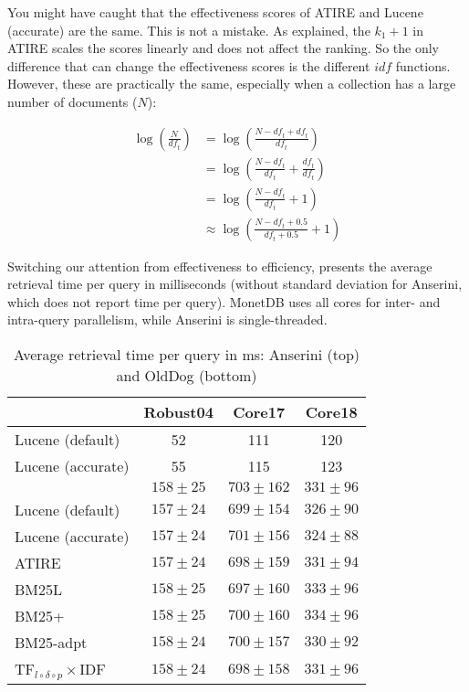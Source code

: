 You might have caught that the effectiveness scores of ATIRE and Lucene (accurate) are the same. This is not a mistake. As explained, the $k_1+1$ in ATIRE scales the scores linearly and does not affect the ranking. So the only difference that can change the effectiveness scores is the different $\mathit{idf}$ functions. However, these are practically the same, especially when a collection has a large number of documents ($N$):

\begin{align}
	\log\left(\frac{N}{\mathit{df}_t}\right) &= \log\left(\frac{N-\mathit{df}_t+\mathit{df}_t}{\mathit{df}_t}\right) \\
	&= \log\left(\frac{N-\mathit{df}_t}{\mathit{df}_t} + \frac{\mathit{df}_t}{\mathit{df}_t}\right) \\
	&= \log\left(\frac{N-\mathit{df}_t}{\mathit{df}_t} + 1\right) \\
	&\approx \log\left(\frac{N-\mathit{df}_t+0.5}{\mathit{df}_t+0.5} + 1\right)
\end{align}

Switching our attention from effectiveness to efficiency,
 presents the average retrieval time per query in milliseconds (without standard deviation for Anserini, which does not report time per query). MonetDB uses all cores for inter- and intra-query parallelism, while Anserini is single-threaded.

\begin{table}
	\centering
	\caption{Average retrieval time per query in ms: Anserini (top) and OldDog (bottom)}
	\label{bm25_effiency}
	\begin{tabular}{l | c c c}
		\toprule
		&Robust04&Core17&Core18\\
		\midrule
		Lucene (default)&52&111&120\\
		Lucene (accurate)&55&115&123\\
		\midrule
		\citeauthor{bm25-robertson}&$158\pm25$&$703\pm162$&$331\pm96$\\
		Lucene (default)&$157\pm24$&$699\pm154$&$326\pm90$\\
		Lucene (accurate)&$157\pm24$&$701\pm156$&$324\pm88$\\
		ATIRE&$157\pm24$&$698\pm159$&$331\pm94$\\
		BM25L&$158\pm25$&$697\pm160$&$333\pm96$\\
		BM25+&$158\pm25$&$700\pm160$&$334\pm96$\\
		BM25-adpt&$158\pm24$&$700\pm157$&$330\pm92$\\
		TF$_{l\circ\delta\circ p}\times$IDF&$158\pm24$&$698\pm158$&$331\pm96$ \\
		\bottomrule
	\end{tabular}
\end{table}

